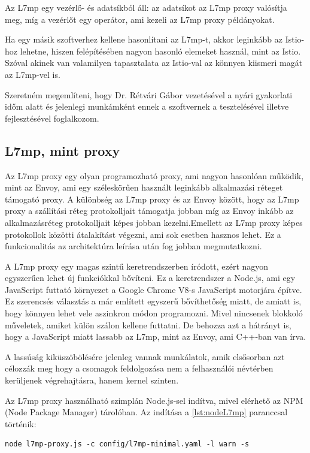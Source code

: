 Az L7mp egy vezérlő- és adatsíkból áll: az adatsíkot az L7mp proxy valósítja meg, míg a 
vezérlőt egy operátor, ami kezeli az L7mp proxy példányokat.

Ha egy másik szoftverhez kellene hasonlítani az L7mp-t, akkor leginkább az Istio-hoz 
lehetne, hiszen felépítésében nagyon hasonló elemeket használ, mint az Istio. Szóval 
akinek van valamilyen tapasztalata az Istio-val az könnyen kiismeri magát az L7mp-vel is.

Szeretném megemlíteni, hogy Dr. Rétvári Gábor vezetésével a nyári gyakorlati időm alatt 
és jelenlegi munkámként ennek a szoftvernek a tesztelésével  illetve fejlesztésével 
foglalkozom. 

\subsection{L7mp, mint proxy}

Az L7mp proxy egy olyan programozható proxy, ami nagyon hasonlóan működik, mint az Envoy, 
ami egy széleskörűen használt leginkább alkalmazási réteget támogató proxy. A különbség 
az L7mp proxy és az Envoy között, hogy az L7mp proxy a szállítási réteg protokolljait  
támogatja jobban míg az Envoy inkább az alkalmazásréteg protokolljait képes jobban  
kezelni.Emellett az L7mp proxy képes protokollok közötti átalakítást végezni, ami sok 
esetben hasznos lehet. Ez a funkcionalitás az architektúra leírása után fog jobban 
megmutatkozni.

A L7mp proxy egy magas szintű keretrendszerben íródott, ezért nagyon egyszerűen 
lehet új funkciókkal bővíteni. Ez a keretrendszer a Node.js, ami egy JavaScript
futtató környezet a Google Chrome V8-s JavaScript motorjára építve. Ez szerencsés 
választás a már említett egyszerű bővíthetőség miatt, de amiatt is, hogy
könnyen lehet vele aszinkron módon programozni. Mivel nincsenek blokkoló műveletek,
amiket külön szálon kellene futtatni. De behozza azt a hátrányt is, hogy a 
JavaScript miatt lassabb az L7mp, mint az Envoy, ami C++-ban van írva. 

A lassúság kiküszöbölésére jelenleg vannak munkálatok, amik elsősorban azt 
célozzák meg hogy a csomagok feldolgozása nem a felhasználói névtérben kerüljenek
végrehajtásra, hanem kernel szinten. 

Az L7mp proxy használható szimplán Node.js-sel indítva, mivel elérhető az NPM (Node 
Package Manager) tárolóban. Az indítása a \ref{lst:nodeL7mp} paranccsal történik: 

\begin{lstlisting}[caption=L7mp indítása Node.js segítségével, label=lst:nodeL7mp]
node l7mp-proxy.js -c config/l7mp-minimal.yaml -l warn -s
\end{lstlisting}

